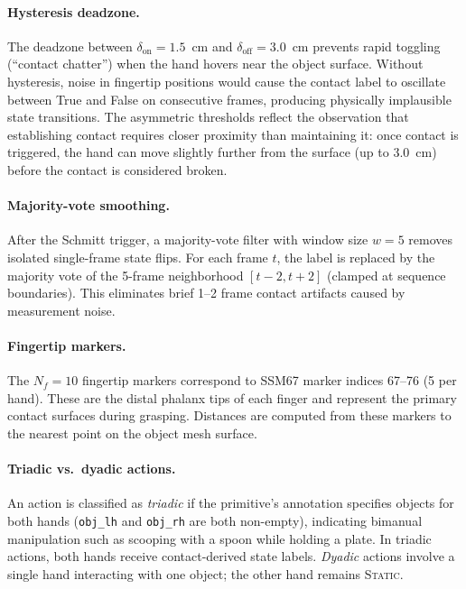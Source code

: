 \documentclass[sigconf, screen, review, anonymous]{acmart}
\begin{document}
\paragraph{Hysteresis deadzone.}
The deadzone between $\delta_{\text{on}} = 1.5$~cm and $\delta_{\text{off}} = 3.0$~cm prevents rapid toggling (``contact chatter'') when the hand hovers near the object surface. Without hysteresis, noise in fingertip positions would cause the contact label to oscillate between True and False on consecutive frames, producing physically implausible state transitions. The asymmetric thresholds reflect the observation that establishing contact requires closer proximity than maintaining it: once contact is triggered, the hand can move slightly further from the surface (up to 3.0~cm) before the contact is considered broken.

\paragraph{Majority-vote smoothing.}
After the Schmitt trigger, a majority-vote filter with window size $w = 5$ removes isolated single-frame state flips. For each frame $t$, the label is replaced by the majority vote of the 5-frame neighborhood $[t{-}2, t{+}2]$ (clamped at sequence boundaries). This eliminates brief 1--2 frame contact artifacts caused by measurement noise.

\paragraph{Fingertip markers.}
The $N_f = 10$ fingertip markers correspond to SSM67 marker indices 67--76 (5 per hand). These are the distal phalanx tips of each finger and represent the primary contact surfaces during grasping. Distances are computed from these markers to the nearest point on the object mesh surface.

\paragraph{Triadic vs.\ dyadic actions.}
An action is classified as \emph{triadic} if the primitive's annotation specifies objects for both hands (\texttt{obj\_lh} and \texttt{obj\_rh} are both non-empty), indicating bimanual manipulation such as scooping with a spoon while holding a plate. In triadic actions, both hands receive contact-derived state labels. \emph{Dyadic} actions involve a single hand interacting with one object; the other hand remains \textsc{Static}.
\end{document}
